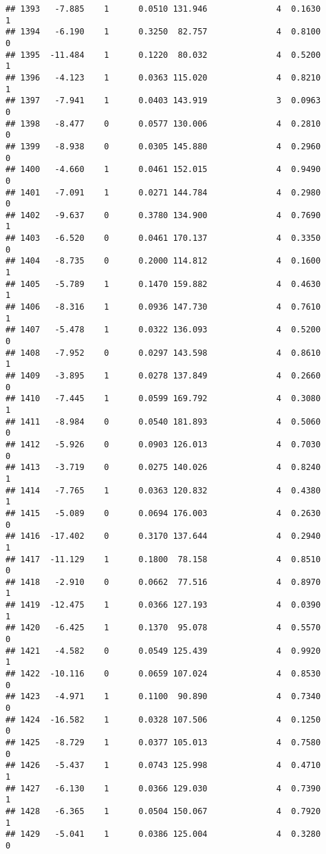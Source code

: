 \documentclass[
]{article}
\begin{document}
\begin{verbatim}
## 1393   -7.885    1      0.0510 131.946              4  0.1630      1
## 1394   -6.190    1      0.3250  82.757              4  0.8100      0
## 1395  -11.484    1      0.1220  80.032              4  0.5200      1
## 1396   -4.123    1      0.0363 115.020              4  0.8210      1
## 1397   -7.941    1      0.0403 143.919              3  0.0963      0
## 1398   -8.477    0      0.0577 130.006              4  0.2810      0
## 1399   -8.938    0      0.0305 145.880              4  0.2960      0
## 1400   -4.660    1      0.0461 152.015              4  0.9490      0
## 1401   -7.091    1      0.0271 144.784              4  0.2980      0
## 1402   -9.637    0      0.3780 134.900              4  0.7690      1
## 1403   -6.520    0      0.0461 170.137              4  0.3350      0
## 1404   -8.735    0      0.2000 114.812              4  0.1600      1
## 1405   -5.789    1      0.1470 159.882              4  0.4630      1
## 1406   -8.316    1      0.0936 147.730              4  0.7610      1
## 1407   -5.478    1      0.0322 136.093              4  0.5200      0
## 1408   -7.952    0      0.0297 143.598              4  0.8610      1
## 1409   -3.895    1      0.0278 137.849              4  0.2660      0
## 1410   -7.445    1      0.0599 169.792              4  0.3080      1
## 1411   -8.984    0      0.0540 181.893              4  0.5060      0
## 1412   -5.926    0      0.0903 126.013              4  0.7030      0
## 1413   -3.719    0      0.0275 140.026              4  0.8240      1
## 1414   -7.765    1      0.0363 120.832              4  0.4380      1
## 1415   -5.089    0      0.0694 176.003              4  0.2630      0
## 1416  -17.402    0      0.3170 137.644              4  0.2940      1
## 1417  -11.129    1      0.1800  78.158              4  0.8510      0
## 1418   -2.910    0      0.0662  77.516              4  0.8970      1
## 1419  -12.475    1      0.0366 127.193              4  0.0390      1
## 1420   -6.425    1      0.1370  95.078              4  0.5570      0
## 1421   -4.582    0      0.0549 125.439              4  0.9920      1
## 1422  -10.116    0      0.0659 107.024              4  0.8530      0
## 1423   -4.971    1      0.1100  90.890              4  0.7340      0
## 1424  -16.582    1      0.0328 107.506              4  0.1250      0
## 1425   -8.729    1      0.0377 105.013              4  0.7580      0
## 1426   -5.437    1      0.0743 125.998              4  0.4710      1
## 1427   -6.130    1      0.0366 129.030              4  0.7390      1
## 1428   -6.365    1      0.0504 150.067              4  0.7920      1
## 1429   -5.041    1      0.0386 125.004              4  0.3280      0

\end{verbatim}
\end{document}
